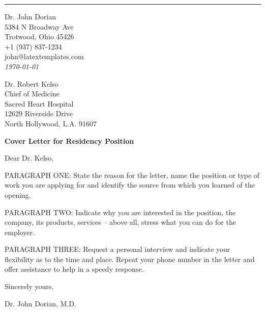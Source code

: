 \documentclass[12pt]{letter}
\begin{document}
\rule{\linewidth}{1pt} %
\medskip

\begingroup
\raggedleft
\small
Dr. John Dorian \\
5384 N Broadway Ave \\
Trotwood, Ohio 45426 \\
+1 (937) 837-1234 \\
john@latextemplates.com \\
\bigskip
{\normalsize\textit{\today}} \\
\endgroup

\begingroup
Dr. Robert Kelso \\
Chief of Medicine \\
Sacred Heart Hospital \\
12629 Riverside Drive \\
North Hollywood, L.A. 91607
\endgroup

\bigskip
\textbf{Cover Letter for Residency Position}

\medskip
Dear Dr. Kelso,

\smallskip

PARAGRAPH ONE: State the reason for the letter, name the position or type of work you are applying for and identify the source from which you learned of the opening.

PARAGRAPH TWO: Indicate why you are interested in the position, the company, its products, services -- above all, stress what you can do for the employer.

PARAGRAPH THREE: Request a personal interview and indicate your flexibility as to the time and place. Repeat your phone number in the letter and offer assistance to help in a speedy response.

\smallskip
Sincerely yours,

\bigskip\bigskip
Dr. John Dorian, M.D.
\end{document}
